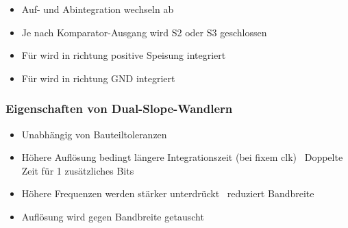 \begin{minipage}[t]{0.48\columnwidth}
    \begin{itemize}
        \item Auf- und Abintegration wechseln ab
        \item Je nach Komparator-Ausgang wird S2 oder S3 geschlossen
    \end{itemize}
\end{minipage}
\hfill
\begin{minipage}[t]{0.48\columnwidth}
    \begin{itemize}
        \item Für  wird in richtung positive Speisung integriert
        \item Für  wird in richtung GND integriert
    \end{itemize}
\end{minipage}


\subsubsection{Eigenschaften von Dual-Slope-Wandlern}

\begin{minipage}[t]{0.48\columnwidth}
    \begin{itemize}
        \item Unabhängig von Bauteiltoleranzen
        \item Höhere Auflösung bedingt längere Integrationszeit (bei fixem clk) 
            \textrightarrow\ Doppelte Zeit für 1 zusätzliches Bits
    \end{itemize}
\end{minipage}
\hfill
\begin{minipage}[t]{0.48\columnwidth}
    \begin{itemize}
        \item Höhere Frequenzen werden stärker unterdrückt \textrightarrow\ reduziert Bandbreite
        \item Auflösung wird gegen Bandbreite getauscht
    \end{itemize}
\end{minipage}

